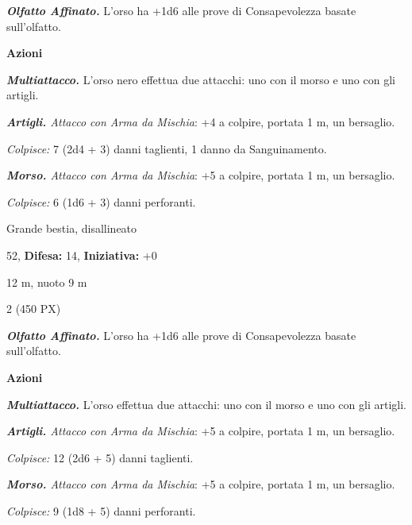 \begin{multicols}{2}
{\emph{\textbf{Olfatto Affinato.}} L'orso ha +1d6 alle prove di Consapevolezza basate sull'olfatto.

\textbf{Azioni}

\emph{\textbf{Multiattacco.}} L'orso nero effettua due attacchi: uno con il morso e uno con gli artigli.

\emph{\textbf{Artigli.} Attacco con Arma da Mischia}: +4 a colpire, portata 1 m, un bersaglio.

\emph{Colpisce:} 7 (2d4 + 3) danni taglienti, 1 danno da Sanguinamento.

\emph{\textbf{Morso.} Attacco con Arma da Mischia}: +5 a colpire, portata 1 m, un bersaglio.

\emph{Colpisce:} 6 (1d6 + 3) danni perforanti.

\begin{description}[noitemsep, topsep=0pt, parsep=0pt, partopsep=0pt, leftmargin=0cm, labelwidth=2.2cm]
    \item[\textbf{Taglia/Tipo:}] Grande bestia, disallineato
    \item[\textbf{Caratt.:}] 
    \item[\textbf{Punti Ferita:}] 52,  \textbf{Difesa:} 14,  \textbf{Iniziativa:} +0
    \item[\textbf{Tiri Salvez.:}] 
    \item[\textbf{Movimento:}] 12 m, nuoto 9 m
    \item[\textbf{Sfida:}] 2 (450 PX)\smallskip
\end{description}

\emph{\textbf{Olfatto Affinato.}} L'orso ha +1d6 alle prove di Consapevolezza basate sull'olfatto.

\textbf{Azioni}

\emph{\textbf{Multiattacco.}} L'orso effettua due attacchi: uno con il morso e uno con gli artigli.

\emph{\textbf{Artigli.} Attacco con Arma da Mischia}: +5 a colpire, portata 1 m, un bersaglio.

\emph{Colpisce:} 12 (2d6 + 5) danni taglienti.

\emph{\textbf{Morso.} Attacco con Arma da Mischia}: +5 a colpire, portata 1 m, un bersaglio.

\emph{Colpisce:} 9 (1d8 + 5) danni perforanti.

}
\end{multicols}
